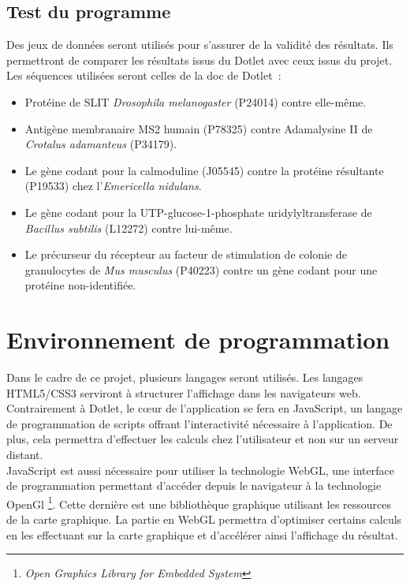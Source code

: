 \documentclass{report}
\begin{document}
\section{Test du programme}

Des jeux de données seront utilisés pour s'assurer de la validité des résultats. Ils permettront de comparer les résultats issus du Dotlet avec ceux issus du projet.
Les séquences utilisées seront celles de la doc de Dotlet~:
\begin{itemize}
	\item Protéine de SLIT \emph{Drosophila melanogaster} (P24014) contre elle-même.
	\item Antigène membranaire MS2 humain (P78325) contre Adamalysine II de \emph{Crotalus adamanteus} (P34179).
	\item Le gène codant pour la calmoduline (J05545) contre la protéine résultante (P19533) chez l'\emph{Emericella nidulans}.
	\item Le gène codant pour la UTP-glucose-1-phosphate uridylyltransferase de \emph{Bacillus subtilis} (L12272) contre lui-même.
	\item Le précurseur du récepteur au facteur de stimulation de colonie de granulocytes de \emph{Mus musculus} (P40223) contre un gène codant pour une protéine non-identifiée.
\end{itemize}

\chapter{Environnement de programmation}

Dans le cadre de ce projet, plusieurs langages seront utilisés. Les langages HTML5/CSS3 serviront à structurer l'affichage dans les navigateurs web.\\
Contrairement à Dotlet, le cœur de l'application se fera en JavaScript, un langage de programmation de scripts offrant l'interactivité nécessaire à l'application. De plus, cela permettra d'effectuer les calculs chez l'utilisateur et non sur un serveur distant.\\
JavaScript est aussi nécessaire pour utiliser la technologie WebGL, une interface de programmation permettant d'accéder depuis le navigateur à la technologie OpenGl \footnote{\emph{Open Graphics Library for Embedded System}}. Cette dernière est une bibliothèque graphique utilisant les ressources de la carte graphique.
La partie en WebGL permettra d'optimiser certains calculs en les effectuant sur la carte graphique et d'accélérer ainsi l'affichage du résultat.\\
\end{document}
